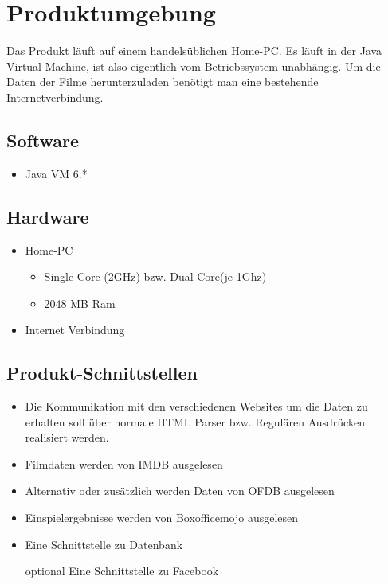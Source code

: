 \section{Produktumgebung}
Das Produkt läuft auf einem handelsüblichen Home-PC. Es läuft in der Java Virtual Machine, ist also eigentlich vom Betriebssystem unabhängig. Um die Daten der Filme herunterzuladen benötigt man eine bestehende Internetverbindung.

\subsection{Software}
\begin{itemize}
	\item Java VM 6.*
\end{itemize}

\subsection{Hardware}
\begin{itemize}
	\item Home-PC
	\begin{itemize}
		\item Single-Core (2GHz) bzw. Dual-Core(je 1Ghz)
		\item 2048 MB Ram
	\end{itemize}
	\item Internet Verbindung
\end{itemize}

\subsection{Produkt-Schnittstellen}
\begin{itemize}
	\item Die Kommunikation mit den verschiedenen Websites um die Daten zu erhalten soll über normale HTML Parser bzw. Regulären Ausdrücken realisiert werden.
	\item Filmdaten werden von IMDB ausgelesen
	\item Alternativ oder zusätzlich werden Daten von OFDB ausgelesen
	\item Einspielergebnisse werden von Boxofficemojo ausgelesen
	\item Eine Schnittstelle zu Datenbank
	\item [optional] Eine Schnittstelle zu Facebook
	
\end{itemize}
